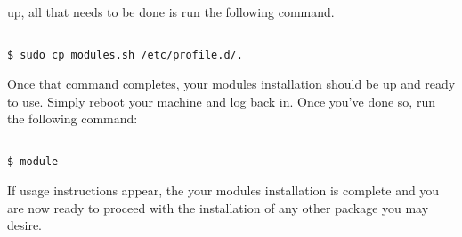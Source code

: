\documentclass[]{article}
\begin{document}
                                                                                                                    up, all that needs to be done is run the following command.
                                                                                                                    \begin{lstlisting}
                                                                                                                    $ sudo cp modules.sh /etc/profile.d/.
                                                                                                                    \end{lstlisting}
                                                                                                                    Once that command completes, your modules installation should be up and ready to use. Simply reboot your
                                                                                                                    machine and log back in. Once you've done so, run the following command:
                                                                                                                    \begin{lstlisting}
                                                                                                                    $ module
                                                                                                                    \end{lstlisting}
                                                                                                                    If usage instructions appear, the your modules installation is complete and you are now ready to proceed
                                                                                                                    with the installation of any other package you may desire.
\end{document}
